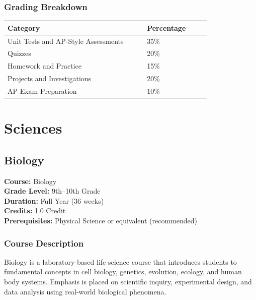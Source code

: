 \documentclass[12pt,oneside]{book}
\begin{document}
\section{Grading Breakdown}
\begin{center}
\begin{tabular}{L{0.55\linewidth}L{0.25\linewidth}}
\toprule
\textbf{Category} & \textbf{Percentage} \\
\midrule
Unit Tests and AP-Style Assessments & 35\% \\
Quizzes & 20\% \\
Homework and Practice & 15\% \\
Projects and Investigations & 20\% \\
AP Exam Preparation & 10\% \\
\bottomrule
\end{tabular}
\end{center}

\part{Sciences}

\chapter{Biology}

\noindent\textbf{Course:} Biology\\
\textbf{Grade Level:} 9th--10th Grade\\
\textbf{Duration:} Full Year (36 weeks)\\
\textbf{Credits:} 1.0 Credit\\
\textbf{Prerequisites:} Physical Science or equivalent (recommended)

\section{Course Description}
Biology is a laboratory-based life science course that introduces students to fundamental concepts
in cell biology, genetics, evolution, ecology, and human body systems. Emphasis is placed on
scientific inquiry, experimental design, and data analysis using real-world biological phenomena.
\end{document}

